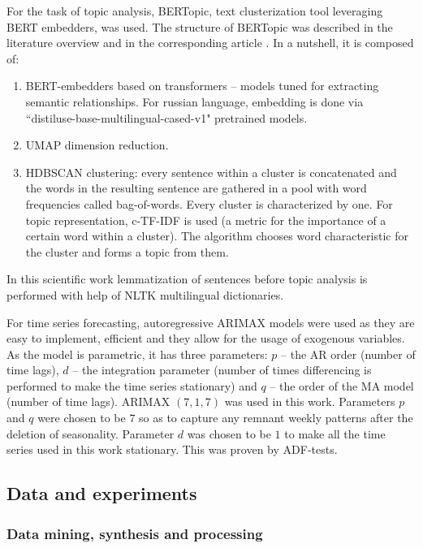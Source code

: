 \documentclass[13pt, a4paper]{article}
\begin{document}
For the task of topic analysis, BERTopic, text clusterization tool leveraging BERT embedders, was used. The structure of BERTopic was described in the literature overview and in the corresponding article \cite{grootendorst2022bertopic}. In a nutshell, it is composed of:
\begin{enumerate}
	\item BERT-embedders based on transformers -- models tuned for extracting semantic relationships. For russian language, embedding is done via ``distiluse-base-multilingual-cased-v1" pretrained models.
	\item UMAP dimension reduction.
	\item HDBSCAN clustering: every sentence within a cluster is concatenated and the words in the resulting sentence are gathered in a pool with word frequencies called bag-of-words. Every cluster is characterized by one. For topic representation, c-TF-IDF is used (a metric for the importance of a certain word within a cluster). The algorithm chooses word characteristic for the cluster and forms a topic from them.
\end{enumerate}
In this scientific work lemmatization of sentences before topic analysis is performed with help of NLTK multilingual dictionaries.

For time series forecasting, autoregressive ARIMAX models were used as they are easy to implement, efficient and they allow for the usage of exogenous variables. As the model is parametric, it has three parameters: $p$ -- the AR order (number of time lags), $d$ -- the integration parameter (number of times differencing is performed to make the time series stationary) and $q$ -- the order of the MA model (number of time lags). ARIMAX $(7,1,7)$ was used in this work. Parameters $p$ and $q$ were chosen to be $7$ so as to capture any remnant weekly patterns after the deletion of seasonality. Parameter $d$ was chosen to be $1$ to make all the time series used in this work stationary. This was proven by ADF-tests.

\newpage

\subsection{Data and experiments}
\vspace{-3mm}
\subsubsection{Data mining, synthesis and processing}
\end{document}
